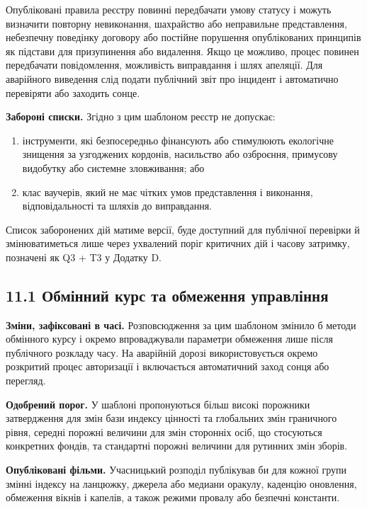 \documentclass[11pt]{article}
\begin{document}
Опубліковані правила реєстру повинні передбачати умову статусу і можуть визначити повторну невиконання, шахрайство або неправильне представлення, небезпечну поведінку договору або постійне порушення опублікованих принципів як підстави для призупинення або видалення. Якщо це можливо, процес повинен передбачати повідомлення, можливість виправдання і шлях апеляції. Для аварійного виведення слід подати публічний звіт про інцидент і автоматично перевіряти або заходить сонце.

\textbf{Забороні списки.} Згідно з цим шаблоном реєстр не допускає:

\begin{enumerate}[leftmargin=*]
\item інструменти, які безпосередньо фінансують або стимулюють екологічне знищення за узгоджених кордонів, насильство або озброєння, примусову видобутку або системне зловживання; або
\item клас ваучерів, який не має чітких умов представлення і виконання, відповідальності та шляхів до виправдання.
\end{enumerate}
Список заборонених дій матиме версії, буде доступний для публічної перевірки й змінюватиметься лише через ухвалений поріг критичних дій і часову затримку, позначені як Q3 + T3 у Додатку D.

\subsection*{11.1 Обмінний курс та обмеження управління}

\textbf{Зміни, зафіксовані в часі.} Розповсюдження за цим шаблоном змінило б методи обмінного курсу і окремо впроваджували параметри обмеження лише після публічного розкладу часу. На аварійній дорозі використовується окремо розкритий процес авторизації і включається автоматичний заход сонця або перегляд.

\textbf{Одобрений порог.} У шаблоні пропонуються більш високі порожники затвердження для змін бази индексу цінності та глобальних змін граничного рівня, середні порожні величини для змін сторонніх осіб, що стосуються конкретних фондів, та стандартні порожні величини для рутинних змін зборів.

\textbf{Опубліковані фільми.} Учасницький розподіл публікував би для кожної групи змінні індексу на ланцюжку, джерела або медиани оракулу, каденцію оновлення, обмеження вікнів і капелів, а також режими провалу або безпечні константи.
\end{document}
